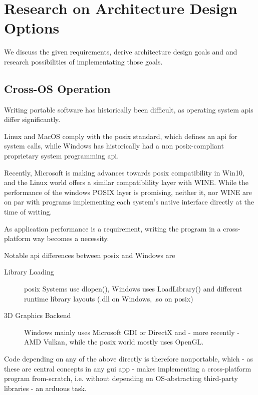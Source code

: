 \chapter{Research on Architecture Design Options}

We discuss the given requirements, derive architecture design goals and and research possibilities of implementating those goals.

\section{Cross-OS Operation}

Writing portable software has historically been difficult, as operating system \gls{api}s differ significantly. 

Linux and MacOS comply with the \gls{posix} standard, which defines an \gls{api} for system calls, while Windows has historically had a non \gls{posix}-compliant proprietary system programming \gls{api}.

Recently, Microsoft is making advances towards \gls{posix} compatibility in Win10, and the Linux world offers a similar compatiblility layer with WINE. While the performance of the windows POSIX layer is promising, neither it, nor WINE are on par with programs implementing each system's native interface directly at the time of writing.

As application performance is a requirement, writing the program in a cross-platform way becomes a necessity.

Notable \gls{api} differences between \gls{posix} and Windows are
\begin{description}
	\item[Library Loading] \gls{posix} Systems use dlopen(), Windows uses LoadLibrary() and different runtime library layouts (.dll on Windows, .so on \gls{posix})
	\item[3D Graphics Backend] Windows mainly uses Microsoft GDI or DirectX and - more recently - AMD Vulkan, while the \gls{posix} world mostly uses OpenGL.
\end{description}

Code depending on any of the above directly is therefore nonportable, which - as these are central concepts in any \gls{gui} app - makes implementing a cross-platform program from-scratch, i.e. without depending on OS-abstracting third-party libraries - an arduous task.

